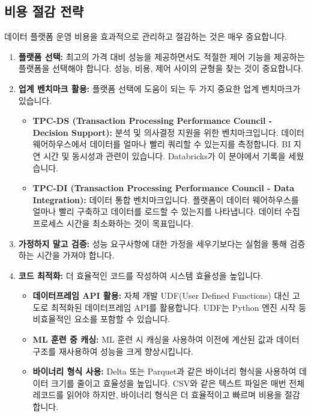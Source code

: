 \documentclass[11pt,a4paper]{article}
\theoremstyle{definition}
\begin{document}
\subsection{비용 절감 전략}
데이터 플랫폼 운영 비용을 효과적으로 관리하고 절감하는 것은 매우 중요합니다.

\begin{enumerate}
    \item \textbf{플랫폼 선택:}
    최고의 가격 대비 성능을 제공하면서도 적절한 제어 기능을 제공하는 플랫폼을 선택해야 합니다. 성능, 비용, 제어 사이의 균형을 찾는 것이 중요합니다.

    \item \textbf{업계 벤치마크 활용:}
    플랫폼 선택에 도움이 되는 두 가지 중요한 업계 벤치마크가 있습니다.
    \begin{itemize}
        \item \textbf{TPC-DS (Transaction Processing Performance Council - Decision Support):} 분석 및 의사결정 지원을 위한 벤치마크입니다. 데이터 웨어하우스에서 데이터를 얼마나 빨리 쿼리할 수 있는지를 측정합니다. BI 지연 시간 및 동시성과 관련이 있습니다. Databricks가 이 분야에서 기록을 세웠습니다.
        \item \textbf{TPC-DI (Transaction Processing Performance Council - Data Integration):} 데이터 통합 벤치마크입니다. 플랫폼이 데이터 웨어하우스를 얼마나 빨리 구축하고 데이터를 로드할 수 있는지를 나타냅니다. 데이터 수집 프로세스 시간을 최소화하는 것이 목표입니다.
    \end{itemize}

    \item \textbf{가정하지 말고 검증:}
    성능 요구사항에 대한 가정을 세우기보다는 실험을 통해 검증하는 시간을 가져야 합니다.

    \item \textbf{코드 최적화:}
    더 효율적인 코드를 작성하여 시스템 효율성을 높입니다.
    \begin{itemize}
        \item \textbf{데이터프레임 API 활용:} 자체 개발 UDF(User Defined Functions) 대신 고도로 최적화된 데이터프레임 API를 활용합니다. UDF는 Python 엔진 시작 등 비효율적인 요소를 포함할 수 있습니다.
        \item \textbf{ML 훈련 중 캐싱:} ML 훈련 시 캐싱을 사용하여 이전에 계산된 값과 데이터 구조를 재사용하여 성능을 크게 향상시킵니다.
        \item \textbf{바이너리 형식 사용:} Delta 또는 Parquet과 같은 바이너리 형식을 사용하여 데이터 크기를 줄이고 효율성을 높입니다. CSV와 같은 텍스트 파일은 매번 전체 레코드를 읽어야 하지만, 바이너리 형식은 더 효율적이고 빠르며 비용을 절감합니다.
    \end{itemize}


\end{enumerate}
\end{document}
